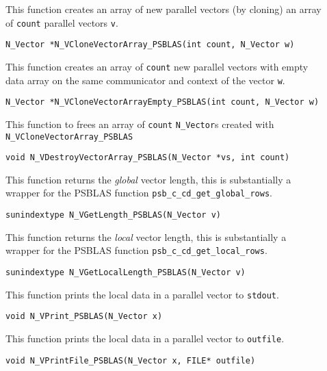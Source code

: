 \documentclass[twoside,a4paper]{refart}
\begin{document}
\begin{description}
	\item[] This function creates an array of new parallel vectors (by cloning) an array of \lstinline[style=CStyle]|count| parallel vectors \lstinline[style=CStyle]|v|.
	
	 \lstinline[style=CStyle]|N_Vector *N_VCloneVectorArray_PSBLAS(int count, N_Vector w)|
	
	\item[] This function creates an array of \lstinline[style=CStyle]|count| new parallel vectors with empty data array on the same communicator and context of the vector \lstinline[style=CStyle]|w|. 
	
	 \lstinline[style=CStyle]|N_Vector *N_VCloneVectorArrayEmpty_PSBLAS(int count, N_Vector w)|
	
	\item[] This function to frees an array of \lstinline[style=CStyle]|count| \texttt{N\_Vector}s created with \texttt{N\_VCloneVectorArray\_PSBLAS}
	
	 \lstinline[style=CStyle]|void N_VDestroyVectorArray_PSBLAS(N_Vector *vs, int count)|
	
	\item[] This function returns the \emph{global} vector length, this is substantially a wrapper for the PSBLAS function \lstinline[style=CStyle]|psb_c_cd_get_global_rows|.
	
	 \lstinline[style=CStyle]|sunindextype N_VGetLength_PSBLAS(N_Vector v)|
	
	\item[] This function returns the \emph{local} vector length, this is substantially a wrapper for the PSBLAS function \lstinline[style=CStyle]|psb_c_cd_get_local_rows|.
	
	 \lstinline[style=CStyle]|sunindextype N_VGetLocalLength_PSBLAS(N_Vector v)|
	
	\item[] This function prints the local data in a parallel vector to \lstinline[style=CStyle]|stdout|.
	
	 \lstinline[style=CStyle]|void N_VPrint_PSBLAS(N_Vector x)|
	
	\item[] This function prints the local data in a parallel vector to \lstinline[style=CStyle]|outfile|.
	
	 \lstinline[style=CStyle]|void N_VPrintFile_PSBLAS(N_Vector x, FILE* outfile)|
	
\end{description}
\end{document}
